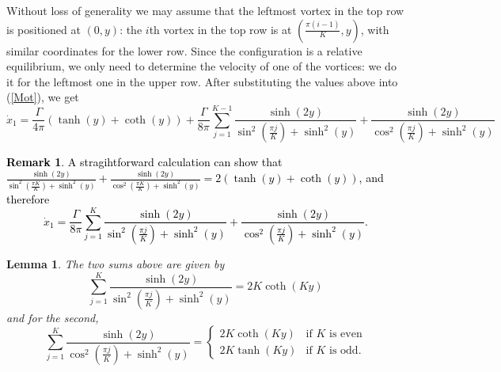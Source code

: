 \documentclass[11pt,twoside]{article}
\newtheorem{lem}[theorem]{Lemma}
\theoremstyle{definition}
\newtheorem{rem}[theorem]{Remark}
\numberwithin{equation}{section}
\begin{document}
Without loss of generality we may assume that the leftmost vortex in the top row is positioned at $(0,y)$: the  $i$th vortex in the top row is at $(\frac{\pi(i-1)}{K},y)$, with similar coordinates for the lower row.  Since the configuration is a relative equilibrium, we only need to determine the velocity of one of the vortices: we do it for the leftmost one in the upper row. After substituting the values above into (\ref{Mot}), we get
\begin{equation}
\label{eq: Re ring velocity}
\dot{x}_1= \frac{\Gamma}{4\pi}\left(\tanh(y) + \coth(y)\right)+ \frac{\Gamma}{8\pi}\sum_{j=1}^{K-1}\frac{\sinh(2y)}{\sin^2\left(\frac{\pi j}{K}\right)  + \sinh^2(y)} + \frac{\sinh(2y)}{\cos^2\left(\frac{\pi j}{K}\right)  + \sinh^2(y)}
\end{equation}
\textcolor{black}{\begin{rem} A stragihtforward calculation can show that $ \frac{\sinh(2y)}{\sin^2\left(\frac{\pi K}{K}\right) + \sinh^2(y)} + \frac{\sinh(2y)}{\cos^2\left(\frac{\pi K}{K}\right) + \sinh^2(y)} = 2\left(\tanh(y) + \coth(y)\right)$, and therefore
$$
\dot{x}_1 = \frac{\Gamma}{8\pi}\sum\limits_{j=1}^{K}\frac{\sinh(2y)}{\sin^2\left(\frac{\pi j}{K}\right) + \sinh^2(y)} + \frac{\sinh(2y)}{\cos^2\left(\frac{\pi j}{K}\right) + \sinh^2(y)}.
$$
\end{rem}
}
 
\begin{lem}
The two sums above are given by
\label{st: the horrible sums}
$$\sum_{j=1}^{K}\frac{\sinh(2y)}{\sin^2\left(\frac{\pi j}{K}\right)  + \sinh^2(y)} = 2K\coth(Ky)$$
and for the second,
$$\sum_{j=1}^{K}\frac{\sinh(2y)}{\cos^2\left(\frac{\pi j}{K}\right)  + \sinh^2(y)} = \begin{cases}
  2K\coth(Ky) & \text{if $K$ is even} \\[12pt]
 \displaystyle 2K\tanh(Ky) & \text{if $K$ is odd}. 
\end{cases}
$$



\end{lem}

\def\Res{\mathop\mathrm{Res}}
\end{document}

